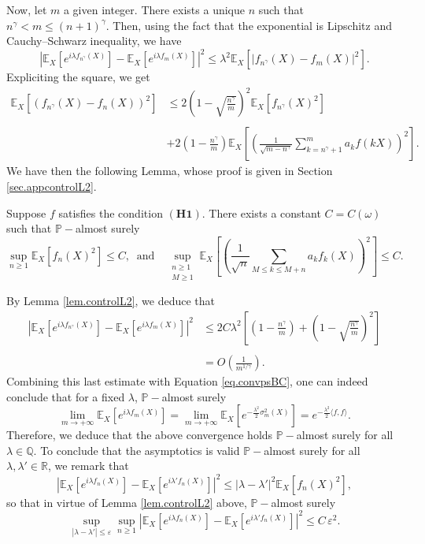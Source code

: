 \documentclass{svproc}
\newcommand \Esp {\mathbb{E}}
\begin{document}
Now, let $m$ a given integer. There exists a unique $n$ such that $n^{\gamma }< m \leq (n+1)^{\gamma}$. Then, using the fact that the exponential is Lipschitz and  Cauchy--Schwarz inequality, we have
\[
\left| \Esp_X\left[e^{i {\lambda} f_{n^\gamma}(X)}\right]-\Esp_X\left[e^{i  {\lambda} f_m(X)}\right]\right|^2 \leq  {\lambda}^2 \Esp_X \left[|f_{n^\gamma}(X)-f_m(X)|^2\right].
\]
Expliciting the square, we get 
\[
\begin{array}{ll}
\displaystyle{\Esp_X \left[(f_{n^\gamma}(X)-f_n(X))^2\right]} &\leq \displaystyle{ 2\left(1-\sqrt{\frac{n^\gamma}{m}} \right)^2\Esp_X\left[f_{n^\gamma}(X)^2\right]}\\
\\
& \displaystyle{+2\left( 1 - \frac{n^{\gamma}}{m}\right)\Esp_X\left[\left(\frac{1}{\sqrt{m-n^{\gamma}}} \sum_{k=n^\gamma+1}^{m}a_kf(kX)\right)^2\right].}
\end{array}
\]
We have then the following Lemma,  whose proof is given in Section \ref{sec.appcontrolL2}. 
\begin{lemma} \label{lem.controlL2}
Suppose $f$ satisfies the condition $\mathbf{(H1)}$. There exists a constant $C=C(\omega)$ such that $\mathbb P-$almost surely 
\[
\sup_{n \geq 1} \mathbb E_X [f_n(X)^2] \leq C, \;\; \textrm{and} \quad \sup_{\substack{n \geq 1\\ M \geq 1}} \mathbb E_X \left[\left(\frac{1}{\sqrt{n}} \sum_{M\leq k \leq M+n}a_k f_k(X)\right)^2\right] \leq C.
\]
\end{lemma}
\noindent
By Lemma \ref{lem.controlL2}, we deduce that 
\[
\begin{array}{ll}
\displaystyle \left| \Esp_X\left[e^{i {\lambda} f_{n^\gamma}(X)}\right]-\Esp_X\left[e^{i {\lambda} f_m(X)}\right]\right|^2 & \displaystyle \leq 2C {\lambda}^2\left[ \left( 1 - \frac{n^{\gamma}}{m}\right) +\left(1-\sqrt{\frac{n^\gamma}{m}} \right)^2 \right] \\
\\
& \displaystyle=O\left(\frac{1}{m^{1/\gamma}}\right).
\end{array}
\]
Combining this last estimate with Equation \eqref{eq.convpsBC}, one can indeed conclude that for a fixed ${\lambda}$, $\mathbb P-$almost surely 
\[
\lim_{m \to +\infty} \Esp_X\left[e^{i {\lambda} f_m(X)} \right]= \lim_{m \to +\infty} \mathbb E_X \left[ e^{-\frac{{\lambda}^2}{2} \sigma_m^2(X)} \right]= e^{-\frac{{\lambda}^2}{2} \langle f,f\rangle}.
\] 
Therefore, we deduce that the above convergence holds $\mathbb P-$almost surely for all ${\lambda} \in \mathbb Q$. To conclude that the asymptotics is valid $\mathbb P-$almost surely for all ${\lambda},{\lambda'} \in \mathbb R$, we remark that 
\[
\left| \Esp_X\left[e^{i {\lambda} f_{n}(X)}\right] -  \Esp_X\left[e^{i {\lambda'} f_{n}(X)}\right] \right|^2 \leq |{\lambda}-{\lambda'}|^2  \mathbb E_X [f_n(X)^2], 
\]
so that in virtue of Lemma \ref{lem.controlL2} above, $\mathbb P-$almost surely 
\[
\sup_{|{\lambda}-{\lambda'}|\leq \varepsilon}\sup_{n \geq 1} \left| \Esp_X\left[e^{i {\lambda} f_{n}(X)}\right] -  \Esp_X\left[e^{i {\lambda'} f_{n}(X)}\right] \right|^2 \leq C \, \varepsilon^2. 
\]
\end{document}
